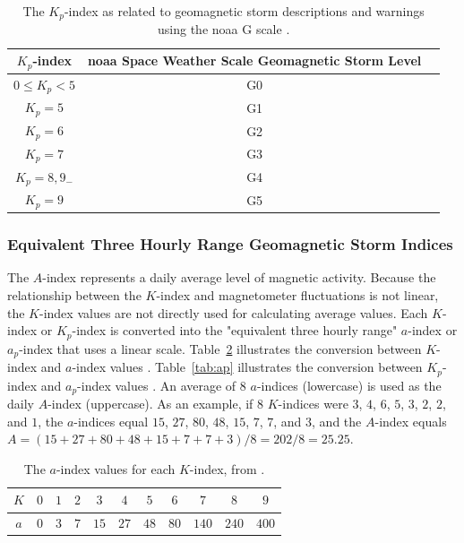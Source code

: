 \documentclass[sn-mathphys-num]{sn-jnl}%
\begin{document}
\begin{table}[!ht]
    \centering
    \caption{The $K_{p}$-index as related to geomagnetic storm descriptions and warnings using the \acrshort{noaa} G scale \cite{NOAA2024eSpace, NOAA2024fScales}.}
    \label{tab:Kp}
    \begin{tabular}{|c|c|c|}
        \hline
        $K_{p}$-index & \acrshort{noaa} Space Weather Scale Geomagnetic Storm Level \\ \hline
        $0\leq K_{p}<5$ & G0 \\ \hline
        $K_{p}=5$ & G1 \\ \hline
        $K_{p}=6$ & G2 \\ \hline
        $K_{p}=7$ & G3 \\ \hline
        $K_{p}=8, 9_{-}$ & G4 \\ \hline
        $K_{p}=9$ & G5 \\ \hline
    \end{tabular}
\end{table}

\subsubsection{Equivalent Three Hourly Range Geomagnetic Storm Indices}

The $A$-index \cite{NOAA2024gGeomagneticIndices} represents a daily average level of magnetic activity. Because the relationship between the $K$-index and magnetometer fluctuations is not linear, the $K$-index values are not directly used for calculating average values. Each $K$-index or $K_{p}$-index is converted into the "equivalent three hourly range" $a$-index or $a_{p}$-index that uses a linear scale. Table~\ref{tab:a} illustrates the conversion between $K$-index and $a$-index values \cite{NOAA2024bKindex}. Table~\ref{tab:ap} illustrates the conversion between $K_{p}$-index and $a_{p}$-index values \cite{NOAA2024gGeomagneticIndices}. An average of $8$ $a$-indices (lowercase) is used as the daily $A$-index (uppercase). As an example, if $8$ $K$-indices were $3$, $4$, $6$, $5$, $3$, $2$, $2$, and $1$, the $a$-indices equal $15$, $27$, $80$, $48$, $15$, $7$, $7$, and $3$, and the $A$-index equals $A = (15 + 27 + 80 + 48 + 15 + 7 + 7 + 3)/8 = 202 / 8 = 25.25$.

\begin{table}[!ht]
    \centering
    \caption{The $a$-index values for each $K$-index, from \cite{NOAA2024bKindex}.}
    \label{tab:a}
    \begin{tabular}{|c|c|c|c|c|c|c|c|c|c|c|}
        \hline
        $K$ & $0$ & $1$ & $2$ & $3$ & $4$ & $5$ & $6$ & $7$ & $8$ & $9$ \\ \hline
        $a$ & $0$ & $3$ & $7$ & $15$ & $27$ & $48$ & $80$ & $140$ & $240$ & $400$ \\ \hline
    \end{tabular}
\end{table}
\end{document}
